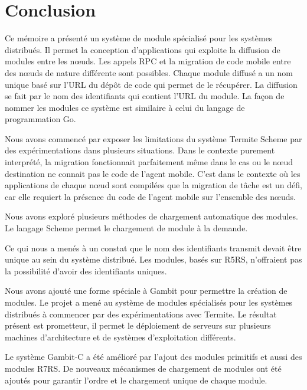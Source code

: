 
\chapter{Conclusion}

Ce mémoire a présenté un système de module spécialisé pour les systèmes
distribués. Il permet la conception d'applications qui exploite la diffusion de
modules entre les nœuds. Les appels RPC et la migration de code mobile entre
des nœuds de nature différente sont possibles. Chaque module diffusé a un nom
unique basé sur l'URL du dépôt de code qui permet de le récupérer. La diffusion
se fait par le nom des identifiants qui contient l'URL du module. La façon de nommer les
modules ce système est similaire à celui du langage de programmation Go.

Nous avons commencé par exposer les limitations du système Termite Scheme par
des expérimentations dans plusieurs situations. Dans le contexte purement
interprété, la migration fonctionnait parfaitement même dans le cas ou le nœud
destination ne connait pas le code de l'agent mobile.  C'est dans le contexte
où les applications de chaque nœud sont compilées que la migration de tâche
est un défi, car elle requiert la présence du code de l'agent mobile sur l'ensemble
des nœuds.

Nous avons exploré plusieurs méthodes de chargement automatique des modules.
Le langage Scheme permet le chargement de module à la demande.

Ce qui nous a menés à un constat que le nom des identifiants transmit devait
être unique au sein du système distribué. Les modules, basés sur R5RS,
n'offraient pas la possibilité d'avoir des identifiants uniques.

Nous avons ajouté une forme spéciale à Gambit pour permettre la création de
modules. Le projet a mené au système de modules spécialisés pour les systèmes
distribués à commencer par des expérimentations avec Termite. Le résultat
présent est prometteur, il permet le déploiement de serveurs sur plusieurs
machines d'architecture et de systèmes d'exploitation différents.

Le système Gambit-C a été amélioré par l'ajout des modules primitifs et aussi
des modules R7RS. De nouveaux mécanismes de chargement de modules ont été
ajoutés pour garantir l'ordre et le chargement unique de chaque module.



